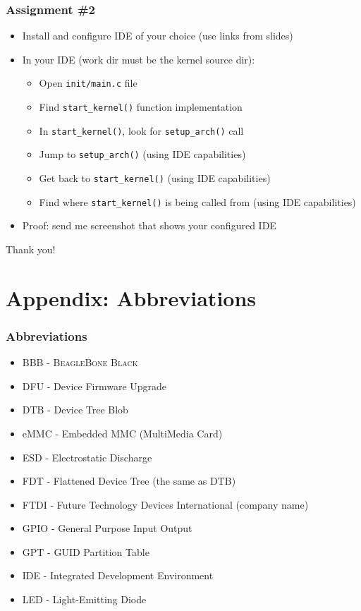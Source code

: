 \documentclass[aspectratio=169]{beamer}
\begin{document}
\begin{frame}
  \frametitle{Assignment \#2}
  \begin{itemize}
    \item Install and configure IDE of your choice (use links from slides)
    \item In your IDE (work dir must be the kernel source dir):
      \begin{itemize}
      \item Open \texttt{init/main.c} file
      \item Find \texttt{start\_kernel()} function implementation
      \item In \texttt{start\_kernel()}, look for \texttt{setup\_arch()} call
      \item Jump to \texttt{setup\_arch()} (using IDE capabilities)
      \item Get back to \texttt{start\_kernel()} (using IDE capabilities)
      \item Find where \texttt{start\_kernel()} is being called from (using IDE
            capabilities)
      \end{itemize}
    \item Proof: send me screenshot that shows your configured IDE
  \end{itemize}
\end{frame}

\begin{frame}[standout]
  Thank you!
\end{frame}

\section*{Appendix: Abbreviations}

\begin{frame}
  \frametitle{Abbreviations}
  \begin{itemize}
    \item BBB - \textsc{BeagleBone Black}
    \item DFU - Device Firmware Upgrade
    \item DTB - Device Tree Blob
    \item eMMC - Embedded MMC (MultiMedia Card)
    \item ESD - Electrostatic Discharge
    \item FDT - Flattened Device Tree (the same as DTB)
    \item FTDI - Future Technology Devices International (company name)
    \item GPIO - General Purpose Input Output
    \item GPT - GUID Partition Table
    \item IDE - Integrated Development Environment
    \item LED - Light-Emitting Diode
  \end{itemize}
\end{frame}
\end{document}
